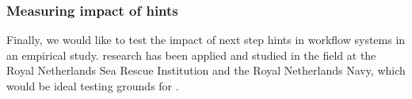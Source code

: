 \subsubsection{Measuring impact of hints}
Finally, we would like to test the impact of next step hints in workflow systems in an empirical study.
\TOP research has been applied and studied in the field at the Royal Netherlands Sea Rescue Institution and the Royal Netherlands Navy, which would be ideal testing grounds for \ASTOPHAT.
